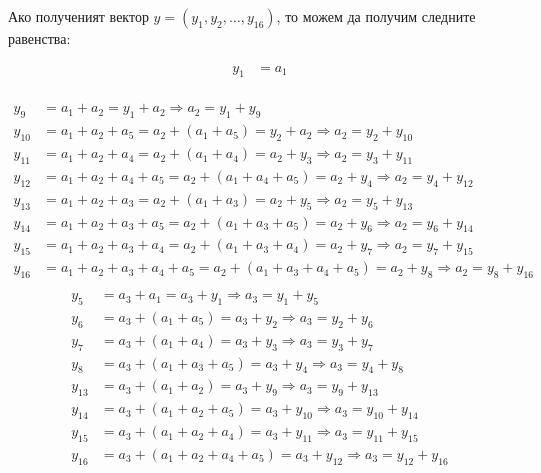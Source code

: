 \documentclass[11pt, oneside]{article}   	%
\begin{document}
Ако полученият вектор $y = (y_{1}, y_{2}, \hdots, y_{16})$, то можем да получим следните равенства:

\begin{align*}
y_1 &= a_1 \\
\end{align*}

\begin{align*}
y_9 &= a_1 + a_2 = y_1 + a_2 \Rightarrow a_2 = y_1 + y_9 \\
y_{10} &= a_1 + a_2 + a_5 = a_2 + (a_1 + a_5) = y_2 + a_2 \Rightarrow a_2 = y_2 + y_{10} \\
y_{11} &= a_1 + a_2 + a_4 = a_2 + (a_1 + a_4) = a_2 + y_3 \Rightarrow a_2 = y_3 + y_{11} \\
y_{12} &= a_1 + a_2 + a_4 + a_5 = a_2 + (a_1 + a_4 + a_5) = a_2 + y_4 \Rightarrow a_2 = y_4 + y_{12} \\
y_{13} &= a_1 + a_2 + a_3 = a_2 + (a_1 + a_3) = a_2 + y_5 \Rightarrow a_2 = y_5 + y_{13} \\
y_{14} &= a_1 + a_2 + a_3 + a_5 = a_2 + (a_1 + a_3 + a_5) = a_2 + y_6 \Rightarrow a_2 = y_6 + y_{14} \\
y_{15} &= a_1 + a_2 + a_3 + a_4 = a_2 + (a_1 + a_3 + a_4) = a_2 + y_7 \Rightarrow a_2 = y_7 + y_{15} \\
y_{16} &= a_1 + a_2 + a_3 + a_4 + a_5 = a_2 + (a_1 + a_3 + a_4 + a_5) = a_2 + y_8 \Rightarrow a_2 = y_8 + y_{16} \\
\end{align*}
\vspace{-7ex}
\begin{align*}
y_5 &= a_3 + a_1 = a_3 + y_1 \Rightarrow a_3 = y_1 + y_5 \\
y_6 &= a_3 + (a_1 + a_5) = a_3 + y_2 \Rightarrow a_3 = y_2 + y_6 \\
y_7 &= a_3 + (a_1 + a_4) = a_3 + y_3 \Rightarrow a_3 = y_3 + y_7 \\
y_8 &= a_3 + (a_1 + a_3 + a_5) = a_3 + y_4 \Rightarrow a_3 = y_4 + y_8 \\
y_{13} &= a_3 + (a_1 + a_2) = a_3 + y_9 \Rightarrow a_3 = y_9 + y_{13} \\
y_{14} &= a_3 + (a_1 + a_2 + a_5) = a_3 + y_{10} \Rightarrow a_3 = y_{10} + y_{14} \\
y_{15} &= a_3 + (a_1 + a_2 + a_4) = a_3 + y_{11} \Rightarrow a_3 = y_{11} + y_{15} \\
y_{16} &= a_3 + (a_1 + a_2 + a_4 + a_5) = a_3 + y_{12} \Rightarrow a_3 = y_{12} + y_{16} \\
\end{align*}
\end{document}

